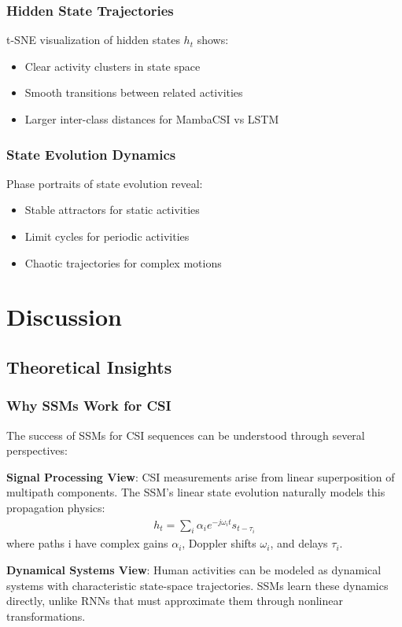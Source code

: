 \documentclass[journal]{IEEEtran}
\begin{document}
\subsubsection{Hidden State Trajectories}
t-SNE visualization of hidden states $h_t$ shows:
\begin{itemize}
\item Clear activity clusters in state space
\item Smooth transitions between related activities
\item Larger inter-class distances for MambaCSI vs LSTM
\end{itemize}

\subsubsection{State Evolution Dynamics}
Phase portraits of state evolution reveal:
\begin{itemize}
\item Stable attractors for static activities
\item Limit cycles for periodic activities
\item Chaotic trajectories for complex motions
\end{itemize}

\section{Discussion}

\subsection{Theoretical Insights}

\subsubsection{Why SSMs Work for CSI}
The success of SSMs for CSI sequences can be understood through several perspectives:

\textbf{Signal Processing View}: CSI measurements arise from linear superposition of multipath components. The SSM's linear state evolution naturally models this propagation physics:
\begin{align}
h_t = \sum_i \alpha_i e^{-j\omega_i t} s_{t-\tau_i}
\end{align}
where paths i have complex gains $\alpha_i$, Doppler shifts $\omega_i$, and delays $\tau_i$.

\textbf{Dynamical Systems View}: Human activities can be modeled as dynamical systems with characteristic state-space trajectories. SSMs learn these dynamics directly, unlike RNNs that must approximate them through nonlinear transformations.
\end{document}
